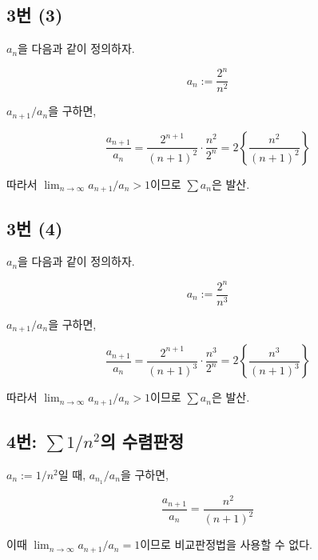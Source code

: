 \subsection{3번 (3)}
$a_n$을 다음과 같이 정의하자.

\[
a_n:=\frac{2^n}{n^2}
\]

$a_{n+1}/a_n$을 구하면,

\[
\frac{a_{n+1}}{a_n}=\frac{2^{n+1}}{(n+1)^2}\cdot\frac{n^2}{2^n}=2\left\{\frac{n^2}{(n+1)^2}\right\}
\]

따라서 $\lim_{n\to\infty}a_{n+1}/a_n>1$이므로 $\sum a_n$은 발산.

\subsection{3번 (4)}
$a_n$을 다음과 같이 정의하자.

\[
a_n:=\frac{2^n}{n^3}
\]

$a_{n+1}/a_n$을 구하면,

\[
\frac{a_{n+1}}{a_n}=\frac{2^{n+1}}{(n+1)^3}\cdot\frac{n^3}{2^n}=2\left\{\frac{n^3}{(n+1)^3}\right\}
\]

따라서 $\lim_{n\to\infty}a_{n+1}/a_n>1$이므로 $\sum a_n$은 발산.

\subsection{4번: $\sum1/n^2$의 수렴판정}
$a_n:=1/n^2$일 때, $a_{n_1}/a_n$을 구하면,

\[
\frac{a_{n+1}}{a_n}=\frac{n^2}{(n+1)^2}
\]

이때 $\lim_{n\to\infty}a_{n+1}/a_n=1$이므로 비교판정법을 사용할 수 없다.
